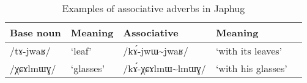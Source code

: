 \documentclass[oneside,a4paper,11pt]{article}
\newcommand{\ipa}[1]{\mbox{\phon/#1/}}
\newcommand{\tld}{\textasciitilde{}}
\begin{document}
\begin{table}
 \caption{Examples of associative adverbs in Japhug} \label{tab:assoc.adv}  \centering
\begin{tabular}{lllll}
\toprule
Base noun & Meaning & Associative & Meaning \\
\midrule
\ipa{tɤ-jwaʁ} & `leaf' & \ipa{kɤ́-jwɯ\tld{}jwaʁ} & `with its leaves' \\
\ipa{χɕɤlmɯɣ} & `glasses' & \ipa{kɤ́-χɕɤlmɯ\tld{}lmɯɣ} & `with his glasses' \\
\bottomrule
\end{tabular}
\end{table}
    
     
\end{document}
